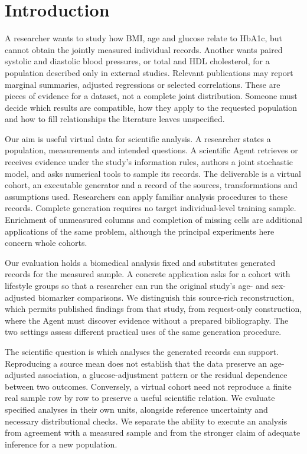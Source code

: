 \documentclass[11pt,letterpaper]{article}
\begin{document}

\section{Introduction}

A researcher wants to study how BMI, age and glucose relate to HbA1c, but cannot obtain the jointly measured individual records. Another wants paired systolic and diastolic blood pressures, or total and HDL cholesterol, for a population described only in external studies. Relevant publications may report marginal summaries, adjusted regressions or selected correlations. These are pieces of evidence for a dataset, not a complete joint distribution. Someone must decide which results are compatible, how they apply to the requested population and how to fill relationships the literature leaves unspecified.


Our aim is useful virtual data for scientific analysis. A researcher states a population, measurements and intended questions. A scientific Agent retrieves or receives evidence under the study's information rules, authors a joint stochastic model, and asks numerical tools to sample its records. The deliverable is a virtual cohort, an executable generator and a record of the sources, transformations and assumptions used. Researchers can apply familiar analysis procedures to these records. Complete generation requires no target individual-level training sample. Enrichment of unmeasured columns and completion of missing cells are additional applications of the same problem, although the principal experiments here concern whole cohorts.


Our evaluation holds a biomedical analysis fixed and substitutes generated records for the measured sample. A concrete application asks for a cohort with lifestyle groups so that a researcher can run the original study's age- and sex-adjusted biomarker comparisons. We distinguish this source-rich reconstruction, which permits published findings from that study, from request-only construction, where the Agent must discover evidence without a prepared bibliography. The two settings assess different practical uses of the same generation procedure.


The scientific question is which analyses the generated records can support. Reproducing a source mean does not establish that the data preserve an age-adjusted association, a glucose-adjustment pattern or the residual dependence between two outcomes. Conversely, a virtual cohort need not reproduce a finite real sample row by row to preserve a useful scientific relation. We evaluate specified analyses in their own units, alongside reference uncertainty and necessary distributional checks. We separate the ability to execute an analysis from agreement with a measured sample and from the stronger claim of adequate inference for a new population.
\end{document}
